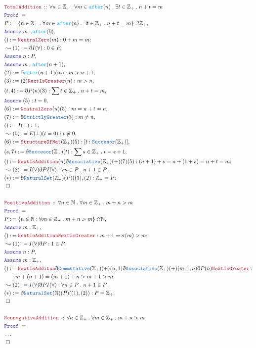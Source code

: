 \documentclass[12pt]{scrartcl}
\newcommand{\TYPE}[1]{\textcolor{NavyBlue}{\mathtt{#1}}}
\newcommand{\FUNC}[1]{\textcolor{Cerulean}{\mathtt{#1}}}
\newcommand{\LOGIC}[1]{\textcolor{Blue}{\mathtt{#1}}}
\newcommand{\THM}[1]{\textcolor{Maroon}{\mathtt{#1}}}
\renewcommand{\.}{\; . \;}
\newcommand{\de}{: \kern 0.1pc =}
\newcommand{\Theorem}[2]{& \THM{#1} \, :: \, #2 \\ & \Proof = \\ }
\newcommand{\NewLine}{\\ & \kern 1pc}
\newcommand{\Page}[1]{ \begin{align*} #1 \end{align*}   }
\newcommand{ \bd }{ \ByDef }
\newcommand{\NoProof}{ & \ldots \\ \EndProof}
\newcommand{\Int}{\mathbb{Z} }
\newcommand{\Nat}{\mathbb{N} }
\newcommand{\Say}[3]{& #1 \de #2 : #3, \\}
\newcommand{\Conclude}[3]{& #1 \de #2 : #3; \\}
\newcommand{\Derive}[3]{& \leadsto #1 \de #2 : #3, \\}
\newcommand{\Assume}[2]{& \LOGIC{Assume} \; #1 : #2, \\}
\newcommand{\QED}{\; \square}
\newcommand{\EndProof}{& \QED \\}
\newcommand{\ByDef}{\eth}
\newcommand{\Proof}{\LOGIC{Proof} \; }
\begin{document}
\Page{
	\Theorem{TotalAddition}{\forall n \in \Int_+ \. \forall m \in \FUNC{after}(n) \. \exists t \in \Int_+ \. n + t = m }
	\Say{P}{\{ n \in \Int_+ \. \forall m \in \FUNC{after}(n) \. \exists t \in \Int_+ \. n + t = m  \}}{?\Int_+}
	\Assume{m}{\FUNC{after}(0)}
	\Conclude{()}{\THM{NeutralZero}(m)}{0 + m = m}
	\Derive{(1)}{\bd I(\forall)}{0 \in P}
	\Assume{n}{P}
	\Assume{m}{\FUNC{after}(n + 1)}
	\Say{(2)}{\bd \FUNC{after}(n +1)(m)}{ m > n + 1}
	\Say{(3)}{(2)\THM{NextIsGreater}(n)}{m > n}
	\Say{(t,4)}{\bd P(n)(3) }{\sum t \in \Int_+ \. n + t = m}
	\Assume{(5)}{t = 0}
	\Say{(6)}{\THM{NeutralZero}(n)(5)}{ m = n + t = n}
	\Say{(7)}{\bd \TYPE{StrictlyGreater}(3)}{m \neq n}
	\Conclude{()}{I(\bot)}{\bot}
	\Derive{(5)}{E(\bot)(t=0)}{t \neq 0}
	\Say{(6)}{\THM{StructureOfNat}(\Int_+)(5)}{[t : \TYPE{Succesor}(\Int_+)]}
	\Say{(s,7)}{\bd \TYPE{Succesor}(\Int_+)(t)}{\sum s \in \Int_+ \. t = s + 1}
	\Conclude{()}{\THM{NextIsAddition}(n)\bd \TYPE{Associative}(\Int_+)(+)(7)(5)}{(n + 1) + s = n + (1 + s) = n + t = m}
	\Derive{(2)}{I(\forall)\bd PI(\forall)}{ \forall n \in P \. n + 1 \in P}
	\Conclude{(*)}{\bd \TYPE{NaturalSet}(\Int_+)(P)((1),(2)}{ \Int_+  = P  }
	\EndProof
	\\ 
	\Theorem{PositiveAddition}{\forall n \in \Nat \. \forall m \in \Int_+ \. m + n > m}
	\Say{P}{\{ n \in \Nat : \forall m \in \Int_+ \. m + n > m  \}}{?\Nat}
	\Assume{m}{\Int_+}
	\Conclude{()}{\THM{NextIsAddition}\THM{NextIsGreater}}{ m + 1 = \sigma(m) > m  }
	\Derive{(1)}{I(\forall)\bd P}{ 1 \in P}
	\Assume{n}{P}
	\Assume{m}{\Int_+}
	\Conclude{()}{\THM{NextIsAdditon}\bd \TYPE{Commutative}(\Int_+)(+)(n,1)\bd \TYPE{Associative}(\Int_+)(+)(m,1,n)\bd P(n)\THM{NextIsGreater}}
	{  \NewLine :  m + (n + 1) = (m +1) + n > m + 1 > m   }
	\Derive{(2)}{I(\forall)\bd P I(\forall)}{\forall n \in P \. n + 1 \in P}
	\Conclude{(*)}{\bd \TYPE{NaturalSet}(\Nat)(P)((1),(2))}{P = \Int_+}
	\EndProof
	\\
	\Theorem{NonnegativeAddition}{\forall n \in \Int_+ \. \forall m \in \Int_+ \. m + n > m}
	\NoProof
}
\newpage
\end{document}
